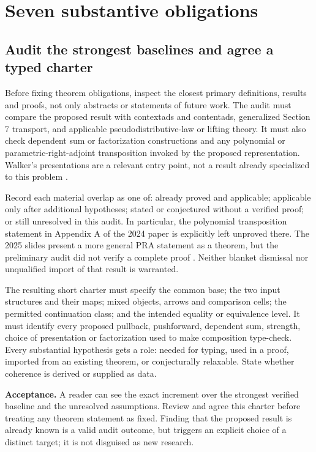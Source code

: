 \documentclass[11pt,a4paper]{article}
\begin{document}
\section{Seven substantive obligations}

\subsection{Audit the strongest baselines and agree a typed charter}

Before fixing theorem obligations, inspect the closest primary definitions,
results and proofs, not only abstracts or statements of future work. The audit
must compare the proposed result with contextads and contentads, generalized
Section 7 transport, and applicable pseudodistributive-law or lifting theory.
It must also check dependent sum or factorization constructions and any
polynomial or parametric-right-adjoint transposition invoked by the proposed
representation. Walker's presentations are a relevant entry point, not a
result already specialized to this problem \cite{Walker}.

Record each material overlap as one of: already proved and applicable;
applicable only after additional hypotheses; stated or conjectured without a
verified proof; or still unresolved in this audit. In particular, the
polynomial transposition statement in Appendix A of the 2024 paper is
explicitly left unproved there. The 2025 slides present a more general PRA
statement as a theorem, but the preliminary audit did not verify a complete
proof \cite{CM,Slides}. Neither blanket dismissal nor unqualified import of
that result is warranted.

The resulting short charter must specify the common base; the two input
structures and their maps; mixed objects, arrows and comparison cells; the
permitted continuation class; and the intended equality or equivalence level.
It must identify every proposed pullback, pushforward, dependent sum, strength,
choice of presentation or factorization used to make composition type-check.
Every substantial hypothesis gets a role: needed for typing, used in a proof,
imported from an existing theorem, or conjecturally relaxable. State whether
coherence is derived or supplied as data.

\textbf{Acceptance.} A reader can see the exact increment over the strongest
verified baseline and the unresolved assumptions. Review and agree this charter
before treating any theorem statement as fixed. Finding that the proposed
result is already known is a valid audit outcome, but triggers an explicit
choice of a distinct target; it is not disguised as new research.
\end{document}
